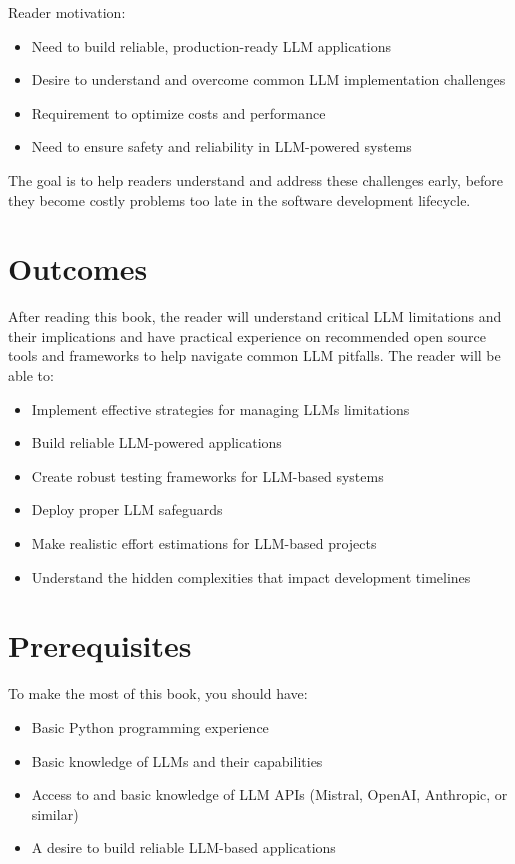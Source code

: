 Reader motivation:

\begin{itemize}
    \item Need to build reliable, production-ready LLM applications
    \item Desire to understand and overcome common LLM implementation challenges
    \item Requirement to optimize costs and performance
    \item Need to ensure safety and reliability in LLM-powered systems
\end{itemize}

The goal is to help readers understand and address these challenges early, before they become costly problems too late in the software development lifecycle. 

\section{Outcomes}

After reading this book, the reader will understand critical LLM limitations and their implications and have practical experience on recommended open source tools and frameworks to help navigate common LLM pitfalls. The reader will be able to:

\begin{itemize}
    \item Implement effective strategies for managing LLMs limitations
    \item Build reliable LLM-powered applications
    \item Create robust testing frameworks for LLM-based systems
    \item Deploy proper LLM safeguards
    \item Make realistic effort estimations for LLM-based projects
    \item Understand the hidden complexities that impact development timelines
\end{itemize}

\section{Prerequisites}

To make the most of this book, you should have:

\begin{itemize}
    \item Basic Python programming experience
    \item Basic knowledge of LLMs and their capabilities
    \item Access to and basic knowledge of LLM APIs (Mistral, OpenAI, Anthropic, or similar)
    \item A desire to build reliable LLM-based applications
\end{itemize}

